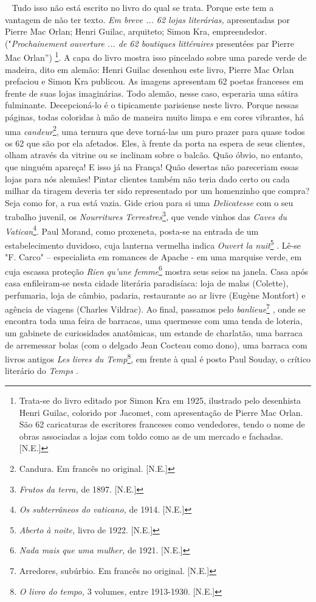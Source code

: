 ~ Tudo isso não está escrito no livro do qual se trata. Porque este tem
a vantagem de não ter texto. \emph{Em breve ... 62 lojas literárias,}
apresentadas por Pierre Mac Orlan; Henri Guilac, arquiteto; Simon Kra,
empreendedor. ("\emph{Prochainement ouverture ... de 62 boutiques
littéraires} presentées par Pierre Mac Orlan'') \footnote{Trata-se do
  livro editado por Simon Kra em 1925, ilustrado pelo desenhista Henri
  Guilac, colorido por Jacomet, com apresentação de Pierre Mac Orlan.
  São 62 caricaturas de escritores franceses como vendedores, tendo o
  nome de obras associadas a lojas com toldo como as de um mercado e
  fachadas. {[}N.E.{]}}. A capa do livro mostra isso pincelado sobre uma
parede verde de madeira, dito em alemão: Henri Guilac desenhou este
livro, Pierre Mac Orlan prefaciou e Simon Kra publicou. As imagens
apresentam 62 poetas franceses em frente de suas lojas imaginárias. Todo
alemão, nesse caso, esperaria uma sátira fulminante. Decepcioná-lo é o
tipicamente parisiense neste livro. Porque nessas páginas, todas
coloridas à mão de maneira muito limpa e em cores vibrantes, há uma
\emph{candeur}\footnote{Candura. Em francês no original. {[}N.E.{]}},
uma ternura que deve torná-las um puro prazer para quase todos os 62 que
são por ela afetados. Eles, à frente da porta na espera de seus
clientes, olham através da vitrine ou se inclinam sobre o balcão. Quão
óbvio, no entanto, que ninguém apareça! E isso já na França! Quão
desertas não pareceriam essas lojas para nós alemães! Pintar clientes
também não teria dado certo ou cada milhar da tiragem deveria ter sido
representado por um homenzinho que compra? Seja como for, a rua está
vazia. Gide criou para si uma \emph{Delicatesse} com o seu trabalho
juvenil, os \emph{Nourritures Terrestres}\footnote{\emph{Frutos da
  terra,} de 1897. {[}N.E.{]}}\emph{,} que vende vinhos das \emph{Caves
du Vatican}\footnote{\emph{Os subterrâneos do vaticano,} de 1914.
  {[}N.E.{]}}. Paul Morand, como proxeneta, posta-se na entrada de um
estabelecimento duvidoso, cuja lanterna vermelha indica \emph{Ouvert la
nuit}\footnote{\emph{Aberto à noite,} livro de 1922. {[}N.E.{]}} . Lê-se
"F. Carco" -- especialista em romances de Apache - em uma marquise
verde, em cuja escassa proteção \emph{Rien qu'une femme}\footnote{\emph{Nada
  mais que uma mulher,} de 1921. {[}N.E.{]}} mostra seus seios na
janela. Casa após casa enfileiram-se nesta cidade literária paradisíaca:
loja de malas (Colette), perfumaria, loja de câmbio, padaria,
restaurante ao ar livre (Eugène Montfort) e agência de viagens (Charles
Vildrac). Ao final, passamos pelo \emph{banlieue}\footnote{Arredores,
  subúrbio. Em francês no original. {[}N.E.{]}} , onde se encontra toda
uma feira de barracas, uma quermesse com uma tenda de loteria, um
gabinete de curiosidades anatômicas, um estande de charlatão, uma
barraca de arremessar bolas (com o delgado Jean Cocteau como dono), uma
barraca com livros antigos \emph{Les livres du Temp}\footnote{\emph{O
  livro do tempo,} 3 volumes, entre 1913-1930. {[}N.E.{]}}, em frente à
qual é posto Paul Souday, o crítico literário do \emph{Temps} .

